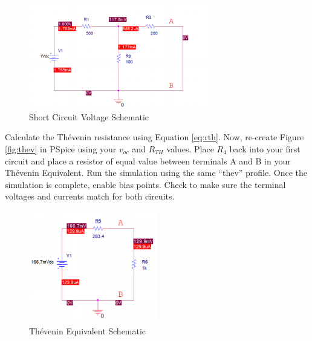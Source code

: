 \documentclass[12pt]{../manual}
\begin{document}
\begin{figure}[ht!]
\begin{center}
\includegraphics[width=0.7\textwidth]{figures/ShortCircuitSchematicCrop.PNG}
\caption{Short Circuit Voltage Schematic}
\label{fig:shortCircuit}
\end{center}
\end{figure}

Calculate the Th\'evenin resistance using Equation \ref{eq:rth}. Now, re-create Figure \ref{fig:thev} in PSpice using your $v_{oc}$ and $R_{TH}$ values. Place $R_4$ back into your first circuit and place a resistor of equal value between terminals A and B in your Th\'evenin Equivalent. Run the simulation using the same ``thev'' profile. Once the simulation is complete, enable bias points. Check to make sure the terminal voltages and currents match for both circuits.

\begin{figure}[ht!]
\begin{center}
\includegraphics[width=0.5\textwidth]{figures/TheveninEquivalentExampleCrop.PNG}
\caption{Th\'evenin Equivalent Schematic}
\label{fig:thevCircuit}
\end{center}
\end{figure}

\newpage
\end{document}
